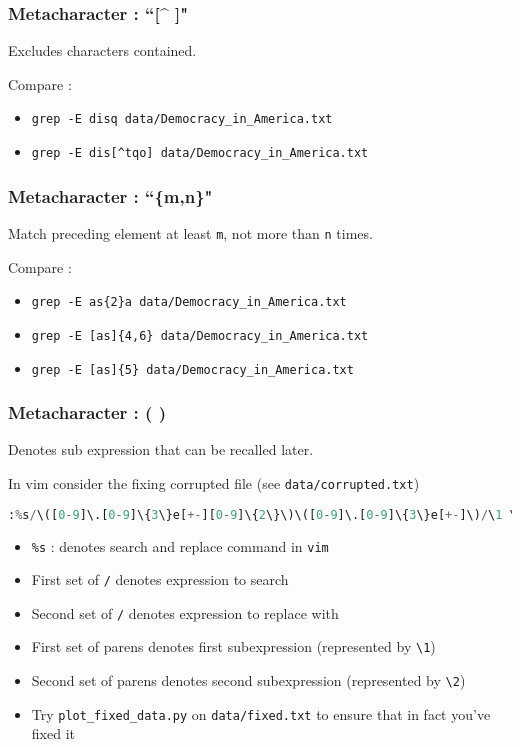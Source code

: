 \documentclass{beamer}
\newcommand{\code}[1]{\colorbox{codegray}{\texttt{#1}}}
\begin{document}
\begin{frame}
\frametitle{Metacharacter : ``[\^{} ]"}
Excludes characters contained. 
\bigskip

Compare :
\begin{itemize}
    \item \code{grep -E disq data/Democracy\_in\_America.txt}
    \pause
    \item \code{grep -E dis[\^{}tqo] data/Democracy\_in\_America.txt}
\end{itemize}
\end{frame}

\begin{frame}
\frametitle{Metacharacter : ``\{m,n\}"}
Match preceding element at least \code{m}, not more than \code{n} times.
\bigskip

Compare :
\begin{itemize}
    \item \code{grep -E as\{2\}a data/Democracy\_in\_America.txt}
    \pause
    \item \code{grep -E [as]\{4,6\} data/Democracy\_in\_America.txt}
    \pause
    \item \code{grep -E [as]\{5\} data/Democracy\_in\_America.txt}
\end{itemize}
\end{frame}

\begin{frame}[fragile]
\frametitle{Metacharacter : ( ) }
\begingroup
Denotes sub expression that can be recalled later.
\bigskip

In vim consider the fixing corrupted file (see \code{data/corrupted.txt})
\begin{lstlisting}[backgroundcolor = \color{codegray}, language = Python, showstringspaces=false, breaklines=true]
:%s/\([0-9]\.[0-9]\{3\}e[+-][0-9]\{2\}\)\([0-9]\.[0-9]\{3\}e[+-]\)/\1 \2/gc
\end{lstlisting}
\endgroup

\begin{itemize}
    \item \code{\%s} : denotes search and replace command in \code{vim}
    \pause
    \item First set of \code{/} denotes expression to search
    \pause
    \item Second set of \code{/} denotes expression to replace with
    \pause
    \item First set of parens denotes first subexpression (represented by \code{\textbackslash 1})
    \pause
    \item Second set of parens denotes second subexpression (represented by \code{\textbackslash 2})
    \pause
    \item Try \code{plot\_fixed\_data.py} on \code{data/fixed.txt} to ensure that in fact you've fixed it
\end{itemize}



\end{frame}
\end{document}
